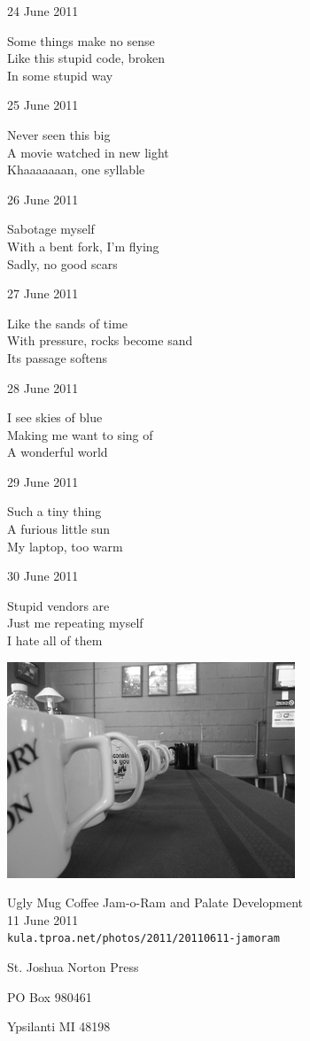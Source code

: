 \documentclass[12pt]{article}
\begin{document}
\newpage

24 June 2011

Some things make no sense \\
Like this stupid code, broken \\
In some stupid way

25 June 2011

Never seen this big \\
A movie watched in new light \\
Khaaaaaaan, one syllable

26 June 2011

Sabotage myself \\
With a bent fork, I'm flying \\
Sadly, no good scars

27 June 2011

Like the sands of time \\
With pressure, rocks become sand \\
Its passage softens

28 June 2011

I see skies of blue \\
Making me want to sing of \\
A wonderful world

29 June 2011

Such a tiny thing \\
A furious little sun \\
My laptop, too warm

30 June 2011

Stupid vendors are \\
Just me repeating myself \\
I hate all of them


\newpage

\begin{center}
\includegraphics{coffee.png}

Ugly Mug Coffee Jam-o-Ram and Palate Development \\
11 June 2011 \\
{\tt kula.tproa.net/photos/2011/20110611-jamoram }
\end{center}



\newpage

\thispagestyle{empty}
\vspace*{12cm}
\begin{sideways}
\Large{St. Joshua Norton Press}
\end{sideways}
\begin{sideways}
\Large{PO Box 980461}
\end{sideways}
\begin{sideways}
\Large{Ypsilanti MI 48198}
\end{sideways}
\end{document}
